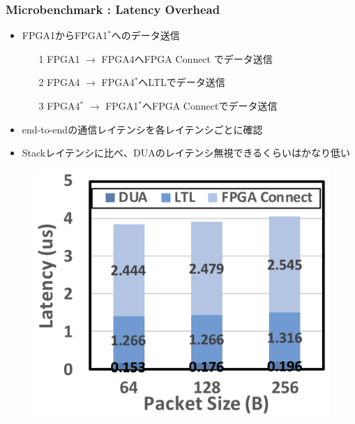 \documentclass[dvipdfmx,9pt,notheorems]{beamer}
\theoremstyle{definition}
\begin{document}
\begin{frame}\frametitle{Microbenchmark : Latency Overhead}
	\begin{itemize}
		\item FPGA1からFPGA1$^{*}$へのデータ送信
			\begin{itemize}
				\item[1] FPGA1 $\rightarrow$ FPGA4へFPGA Connect でデータ送信
				\item[2] FPGA4 $\rightarrow$ FPGA4$^{*}$へLTLでデータ送信
				\item[3] FPGA4$^{*}$ $\rightarrow$ FPGA1$^{*}$へFPGA Connectでデータ送信
			\end{itemize}
		\item end-to-endの通信レイテンシを各レイテンシごとに確認
		\item Stackレイテンシに比べ、DUAのレイテンシ無視できるくらいはかなり低い
	\end{itemize}
  \begin{figure}[htb]
		\includegraphics[scale=1.0]{fig/figure11a.png}
  \end{figure}
\pnote{
}
\end{frame}
\end{document}
